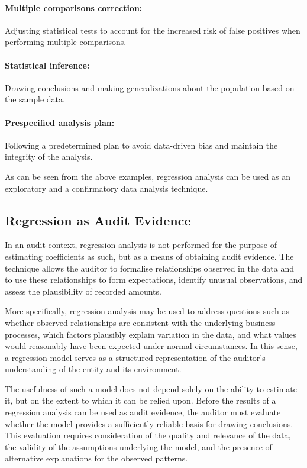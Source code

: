\paragraph{Multiple comparisons correction:} Adjusting statistical tests to account for the increased risk of false positives when performing multiple comparisons.
\paragraph{Statistical inference:} Drawing conclusions and making generalizations about the population based on the sample data.
\paragraph{Prespecified analysis plan:} Following a predetermined plan to avoid data-driven bias and maintain the integrity of the analysis.

\bigskip
As can be seen from the above examples, regression analysis can be used as an exploratory and a confirmatory data analysis technique.


\subsection{Regression as Audit Evidence}
\label{sub:regression_as_audit_evidence}

In an audit context, regression analysis is not performed for the purpose of estimating coefficients as such, but as a means of obtaining audit evidence. The technique allows the auditor to formalise relationships observed in the data and to use these relationships to form expectations, identify unusual observations, and assess the plausibility of recorded amounts.

More specifically, regression analysis may be used to address questions such as whether observed relationships are consistent with the underlying business processes, which factors plausibly explain variation in the data, and what values would reasonably have been expected under normal circumstances. In this sense, a regression model serves as a structured representation of the auditor’s understanding of the entity and its environment.

The usefulness of such a model does not depend solely on the ability to estimate it, but on the extent to which it can be relied upon. Before the results of a regression analysis can be used as audit evidence, the auditor must evaluate whether the model provides a sufficiently reliable basis for drawing conclusions. This evaluation requires consideration of the quality and relevance of the data, the validity of the assumptions underlying the model, and the presence of alternative explanations for the observed patterns.


